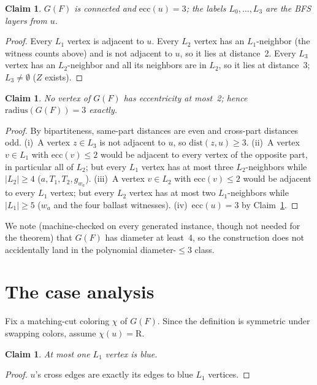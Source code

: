 \documentclass[11pt]{article}
\newtheorem{claim}[theorem]{Claim}
\begin{document}
\begin{claim}\label{cl:conn}
$G(F)$ is connected and $\mathrm{ecc}(u) = 3$; the labels $L_0,\dots,
L_3$ are the BFS layers from $u$.
\end{claim}
\begin{proof}
Every $L_1$ vertex is adjacent to $u$. Every $L_2$ vertex has an
$L_1$-neighbor (the witness counts above) and is not adjacent to $u$,
so it lies at distance~2. Every $L_3$ vertex has an $L_2$-neighbor
and all its neighbors are in $L_2$, so it lies at distance~3; $L_3
\ne \emptyset$ ($Z$ exists).
\end{proof}

\begin{claim}\label{cl:radius}
No vertex of $G(F)$ has eccentricity at most~2; hence
$\mathrm{radius}(G(F)) = 3$ exactly.
\end{claim}
\begin{proof}
By bipartiteness, same-part distances are even and cross-part
distances odd. (i)~A vertex $z \in L_3$ is not adjacent to $u$, so
$\mathrm{dist}(z,u) \ge 3$. (ii)~A vertex $v \in L_1$ with
$\mathrm{ecc}(v) \le 2$ would be adjacent to every vertex of the
opposite part, in particular all of $L_2$; but every $L_1$ vertex has
at most three $L_2$-neighbors while $|L_2| \ge 4$ ($a, T_1, T_2,
g_{w_a}$). (iii)~A vertex $v \in L_2$ with $\mathrm{ecc}(v) \le 2$
would be adjacent to every $L_1$ vertex; but every $L_2$ vertex has at
most two $L_1$-neighbors while $|L_1| \ge 5$ ($w_a$ and the four
ballast witnesses). (iv)~$\mathrm{ecc}(u) = 3$ by
Claim~\ref{cl:conn}.
\end{proof}

We note (machine-checked on every generated instance, though not
needed for the theorem) that $G(F)$ has diameter at least~4, so the
construction does not accidentally land in the polynomial
diameter-$\le 3$ class.

\section{The case analysis}\label{sec:cases}

Fix a matching-cut coloring $\chi$ of $G(F)$. Since the definition is
symmetric under swapping colors, assume $\chi(u) = \mathrm{R}$.

\begin{claim}\label{cl:budget}
At most one $L_1$ vertex is blue.
\end{claim}
\begin{proof}
$u$'s cross edges are exactly its edges to blue $L_1$ vertices.
\end{proof}
\end{document}
